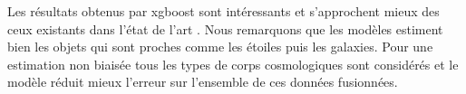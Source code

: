 Les résultats obtenus par xgboost sont intéressants et s'approchent mieux des ceux existants dans l'état de l'art \cite{meuphirim, isanto, photoredSDSS}. Nous remarquons que les modèles estiment bien les objets qui sont proches comme les étoiles puis les galaxies. Pour une estimation non biaisée tous les types de corps cosmologiques sont considérés et le modèle réduit mieux l'erreur sur l'ensemble de ces données fusionnées. 


















